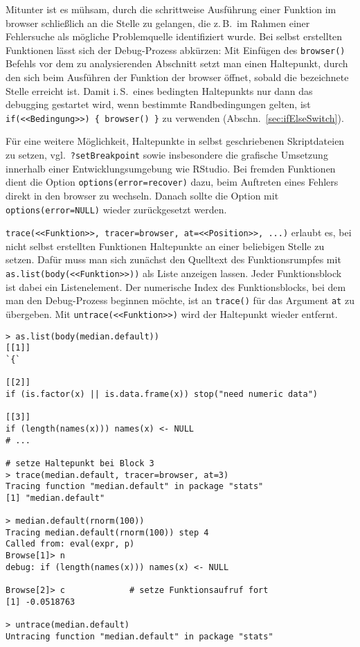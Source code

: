 Mitunter ist es mühsam, durch die schrittweise Ausführung einer Funktion im browser schließlich an die Stelle zu gelangen, die z.\,B.\ im Rahmen einer Fehlersuche als mögliche Problemquelle identifiziert wurde. Bei selbst erstellten Funktionen lässt sich der Debug-Prozess abkürzen: Mit Einfügen des  \lstinline!browser()! Befehls vor dem zu analysierenden Abschnitt setzt man einen Haltepunkt, durch den sich beim Ausführen der Funktion der browser öffnet, sobald die bezeichnete Stelle erreicht ist. Damit i.\,S.\ eines bedingten Haltepunkts nur dann das debugging gestartet wird, wenn bestimmte Randbedingungen gelten, ist \lstinline!if(<<Bedingung>>) { browser() }! zu verwenden (Abschn.\ \ref{sec:ifElseSwitch}).

Für eine weitere Möglichkeit, Haltepunkte in selbst geschriebenen Skriptdateien zu setzen, vgl.\ \lstinline!?setBreakpoint! sowie insbesondere die grafische Umsetzung innerhalb einer Entwicklungsumgebung wie R{}Studio. Bei fremden Funktionen dient die Option \lstinline!options(error=recover)! dazu, beim Auftreten eines Fehlers direkt in den browser zu wechseln. Danach sollte die Option mit \lstinline!options(error=NULL)! wieder zurückgesetzt werden.

\lstinline!trace(<<Funktion>>, tracer=browser, at=<<Position>>, ...)! erlaubt es, bei nicht selbst erstellten Funktionen Haltepunkte an einer beliebigen Stelle zu setzen. Dafür muss man sich zunächst den Quelltext des Funktionsrumpfes mit \lstinline!as.list(body(<<Funktion>>))! als Liste anzeigen lassen. Jeder Funktionsblock ist dabei ein Listenelement. Der numerische Index des Funktionsblocks, bei dem man den Debug-Prozess beginnen möchte, ist an \lstinline!trace()! für das Argument \lstinline!at! zu übergeben. Mit \lstinline!untrace(<<Funktion>>)! wird der Haltepunkt wieder entfernt.
\begin{lstlisting}
> as.list(body(median.default))
[[1]]
`{`

[[2]]
if (is.factor(x) || is.data.frame(x)) stop("need numeric data")

[[3]]
if (length(names(x))) names(x) <- NULL
# ...

# setze Haltepunkt bei Block 3
> trace(median.default, tracer=browser, at=3)
Tracing function "median.default" in package "stats"
[1] "median.default"

> median.default(rnorm(100))
Tracing median.default(rnorm(100)) step 4 
Called from: eval(expr, p)
Browse[1]> n
debug: if (length(names(x))) names(x) <- NULL

Browse[2]> c             # setze Funktionsaufruf fort
[1] -0.0518763

> untrace(median.default)
Untracing function "median.default" in package "stats"
\end{lstlisting}

